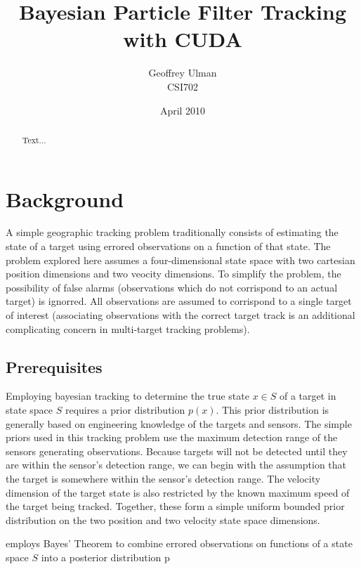\documentclass{article}
\begin{document}
\title{Bayesian Particle Filter Tracking with CUDA}
\author{Geoffrey Ulman\\
        CSI702}
\date{April 2010}
\maketitle

\begin{abstract}
Text...
\end{abstract}

\tableofcontents

\section{Background}
A simple geographic tracking problem traditionally consists of estimating the state of a target using errored observations on a function of that state. The problem explored here assumes a four-dimensional state space with two cartesian position dimensions and two veocity dimensions. To simplify the problem, the possibility of false alarms (observations which do not corrispond to an actual target) is ignorred. All observations are assumed to corrispond to a single target of interest (associating observations with the correct target track is an additional complicating concern in multi-target tracking problems).

\subsection{Prerequisites}
Employing bayesian tracking to determine the true state \(x \in S\) of a target in state space \(S\) requires a prior distribution \(p(x)\). This prior distribution is generally based on engineering knowledge of the targets and sensors. The simple priors used in this tracking problem use the maximum detection range of the sensors generating observations. Because targets will not be detected until they are within the sensor's detection range, we can begin with the assumption that the target is somewhere within the sensor's detection range. The velocity dimension of the target state is also restricted by the known maximum speed of the target being tracked. Together, these form a simple uniform bounded prior distribution on the two position and two velocity state space dimensions.

 employs Bayes' Theorem to combine errored observations on functions of a state space \(S\) into a posterior distribution p
\end{document}
